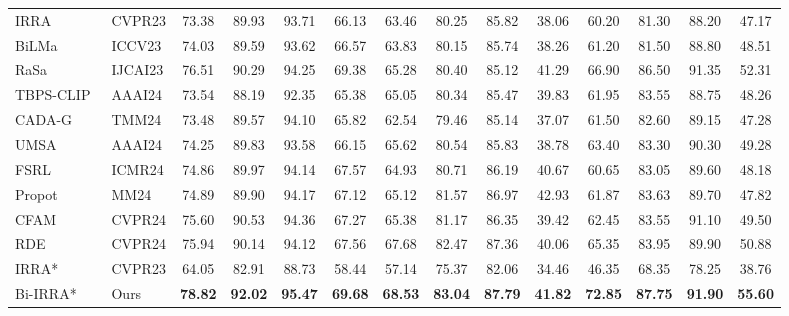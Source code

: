 \begin{table}[t]
{{\begin{tabular}{l|l|cccc|cccc|cccc}
    IRRA~\cite{jiang2023cross} & CVPR23                     & 73.38 & 89.93 & 93.71 & 66.13  & 63.46 & 80.25 & 85.82 & 38.06  & 60.20 & 81.30 & 88.20 & 47.17  \\
    BiLMa~\cite{fujii2023bilma} & ICCV23                    & 74.03 & 89.59 & 93.62 & 66.57  & 63.83 & 80.15 & 85.74 & 38.26  & 61.20 & 81.50 & 88.80 & 48.51  \\
    RaSa~\cite{bai2023rasa}    & IJCAI23                    & 76.51 & 90.29 & 94.25 & 69.38  & 65.28 & 80.40 & 85.12 & 41.29  & 66.90 & 86.50 & 91.35 & 52.31  \\
    TBPS-CLIP~\cite{cao2024empirical}& AAAI24               & 73.54 & 88.19 & 92.35 & 65.38  & 65.05 & 80.34 & 85.47 & 39.83  & 61.95 & 83.55 & 88.75 & 48.26  \\ 
    CADA-G ~\cite{lin2024cross} & TMM24                     & 73.48 & 89.57 & 94.10 & 65.82  & 62.54 & 79.46 & 85.14 & 37.07  & 61.50 & 82.60 & 89.15 & 47.28    \\
    UMSA~\cite{zhao2024unifying}& AAAI24                    & 74.25 & 89.83 & 93.58 & 66.15  & 65.62 & 80.54 & 85.83 & 38.78  & 63.40 & 83.30 & 90.30 & 49.28  \\ 
    FSRL~\cite{wang2024fine}   & ICMR24                     & 74.86 & 89.97 & 94.14 & 67.57  & 64.93 & 80.71 & 86.19 & 40.67  & 60.65 & 83.05 & 89.60 & 48.18  \\
    Propot~\cite{yan2024prototypical} & MM24                & 74.89 & 89.90 & 94.17 & 67.12  & 65.12 & 81.57 & 86.97 & 42.93  & 61.87 & 83.63 & 89.70 & 47.82  \\
    CFAM~\cite{zuo2024ufinebench}& CVPR24                   & 75.60 & 90.53 & 94.36 & 67.27  & 65.38 & 81.17 & 86.35 & 39.42  & 62.45 & 83.55 & 91.10 & 49.50   \\
    RDE~\cite{qin2024noisy}    & CVPR24                     & 75.94 & 90.14 & 94.12 & 67.56  & 67.68 & 82.47 & 87.36 & 40.06  & 65.35 & 83.95 & 89.90 & 50.88  \\ 
    \hdashline
    IRRA*~\cite{jiang2023cross}& CVPR23                     & 64.05 & 82.91 & 88.73 & 58.44 & 57.14 & 75.37 & 82.06 & 34.46
          & 46.35 & 68.35 & 78.25 & 38.76  \\
    \hline\rowcolor[HTML]{D7F6FF}
    Bi-IRRA*                       & Ours                    & \textbf{78.82} & \textbf{92.02} & \textbf{95.47} & \textbf{69.68}  & \textbf{68.53} & \textbf{83.04} & \textbf{87.79} & \textbf{41.82}  & \textbf{72.85} & \textbf{87.75} & \textbf{91.90} & \textbf{55.60}  \\
    \hline\hline

\end{tabular}}}
\end{table}
